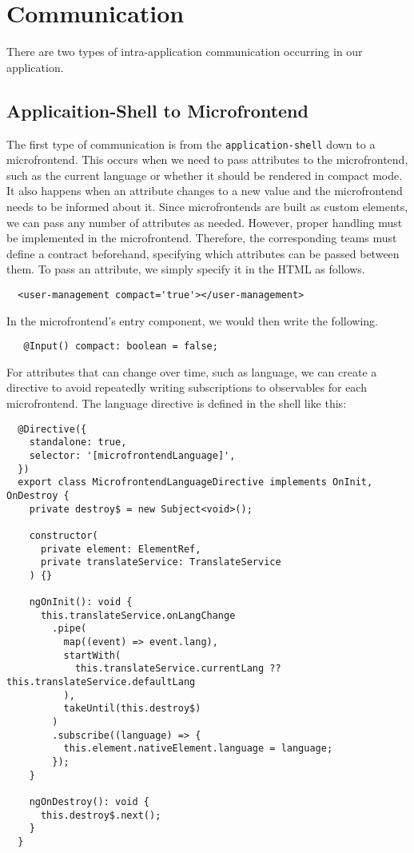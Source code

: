 \section{Communication}
There are two types of intra-application communication occurring in our application.

\subsection*{Applicaition-Shell to Microfrontend}
The first type of communication is from the \texttt{application-shell} down to a microfrontend. This occurs when we need to pass attributes to the microfrontend, such as the current language or whether it should be rendered in compact mode. It also happens when an attribute changes to a new value and the microfrontend needs to be informed about it. Since microfrontends are built as custom elements, we can pass any number of attributes as needed. However, proper handling must be implemented in the microfrontend. Therefore, the corresponding teams must define a contract beforehand, specifying which attributes can be passed between them. To pass an attribute, we simply specify it in the HTML as follows.
\begin{verbatim}
  <user-management compact='true'></user-management>
\end{verbatim}
In the microfrontend's entry component, we would then write the following.
\begin{verbatim}
   @Input() compact: boolean = false;
\end{verbatim}
For attributes that can change over time, such as language, we can create a directive to avoid repeatedly writing subscriptions to observables for each microfrontend. The language directive is defined in the shell like this:
\begin{verbatim}
  @Directive({
    standalone: true,
    selector: '[microfrontendLanguage]',
  })
  export class MicrofrontendLanguageDirective implements OnInit, OnDestroy {
    private destroy$ = new Subject<void>();
    
    constructor(
      private element: ElementRef,
      private translateService: TranslateService
    ) {}
    
    ngOnInit(): void {
      this.translateService.onLangChange
        .pipe(
          map((event) => event.lang),
          startWith(
            this.translateService.currentLang ?? this.translateService.defaultLang
          ),
          takeUntil(this.destroy$)
        )
        .subscribe((language) => {
          this.element.nativeElement.language = language;
        });
    }
    
    ngOnDestroy(): void {
      this.destroy$.next();
    }
  }
\end{verbatim}
